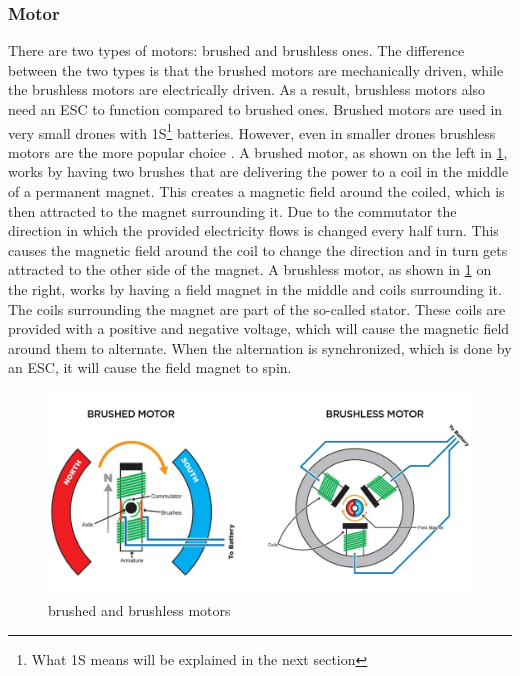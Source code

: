 \documentclass[svgnames]{article}
\begin{document}
	\subsubsection{Motor}
	There are two types of motors: brushed and brushless ones. The difference between the two types is that the brushed motors are mechanically driven, while the brushless motors are electrically driven. As a result, brushless motors also need an ESC to function compared to brushed ones. Brushed motors are used in very small drones with 1S\footnote{What 1S means will be explained in the next section} batteries. However, even in smaller drones brushless motors are the more popular choice \cite{brush/lessmotors}. A brushed motor, as shown on the left in \cref{fig:brushedbrushlessmotor}, works by having two brushes that are delivering the power to a coil in the middle of a permanent magnet. This creates a magnetic field around the coiled, which is then attracted to the magnet surrounding it. Due to the commutator the direction in which the provided electricity flows is changed every half turn. This causes the magnetic field around the coil to change the direction and in turn gets attracted to the other side of the magnet. A brushless motor, as shown in \cref{fig:brushedbrushlessmotor} on the right, works by having a field magnet in the middle and coils surrounding it. The coils surrounding the magnet are part of the so-called stator. These coils are provided with a positive and negative voltage, which will cause the magnetic field around them to alternate. When the alternation is synchronized, which is done by an \gls{ESC}, it will cause the field magnet to spin. 
\begin{figure}[ht]
	\includegraphics[width=0.9\columnwidth]{pictures/brushed_brushlessmotor}
	\caption{brushed and brushless motors \cite{brushlessedmotor}}
	\label{fig:brushedbrushlessmotor}
\end{figure}
\end{document}
